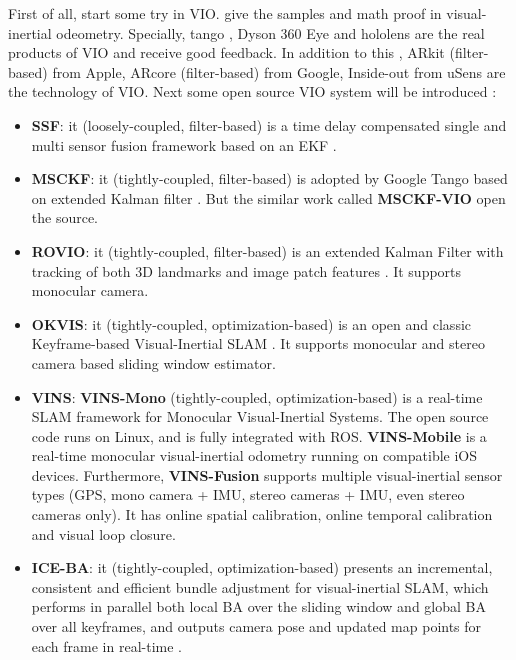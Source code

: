 \documentclass[journal,transmag]{IEEEtran}
\begin{document}
First of all, \cite{leutenegger2015keyframe}\cite{huang2014towards}\cite{li2013high} start some try in VIO. \cite{mur2017visual}\cite{forster2016manifold} give the samples and math proof in visual-inertial odeometry. Specially, tango \cite{froehlich2017investigation}, Dyson 360 Eye and hololens \cite{garon2016real} are the real products of VIO and receive good feedback. In addition to this
, ARkit (filter-based) from Apple, ARcore (filter-based) from Google, Inside-out from uSens are the technology of VIO. Next some open source VIO system will be introduced \cite{delmerico2018benchmark}:
\begin{itemize}
    \item \textbf{SSF}: it (loosely-coupled, filter-based) is a time delay compensated single and multi sensor fusion framework based on an EKF \cite{weiss2012vision}.
    \item \textbf{MSCKF}: it (tightly-coupled, filter-based) is adopted by Google Tango based on extended Kalman filter \cite{mourikis2007multi}. But the similar work called \textbf{MSCKF-VIO} \cite{sun2018robust} open the source.
    \item \textbf{ROVIO}: it (tightly-coupled, filter-based) is an extended Kalman Filter with tracking of both 3D landmarks and image patch features \cite{bloesch2015robust}. It supports monocular camera.
    \item \textbf{OKVIS}: it (tightly-coupled, optimization-based) is an open and classic Keyframe-based Visual-Inertial SLAM \cite{leutenegger2015keyframe}. It supports monocular and stereo camera based sliding window estimator.
    \item \textbf{VINS}: \textbf{VINS-Mono} (tightly-coupled, optimization-based) \cite{li2017monocular}\cite{qin2018vins}\cite{qin2018online} is a real-time SLAM framework for Monocular Visual-Inertial Systems. The open source code runs on Linux, and is fully integrated with ROS.  \textbf{VINS-Mobile} \cite{qin2017robust}\cite{yang2016monocular} is a real-time monocular visual-inertial odometry running on compatible iOS devices. Furthermore, \textbf{VINS-Fusion} supports multiple visual-inertial sensor types (GPS, mono camera + IMU, stereo cameras + IMU, even stereo cameras only). It has online spatial calibration, online temporal calibration and visual loop closure.
    \item \textbf{ICE-BA}: it (tightly-coupled, optimization-based) presents an incremental, consistent and efficient bundle adjustment for visual-inertial SLAM, which  performs in parallel both local BA over the sliding window and global BA over all keyframes, and outputs camera pose and updated map points for each frame in real-time \cite{liu2018ice}.

\end{itemize}
\end{document}
